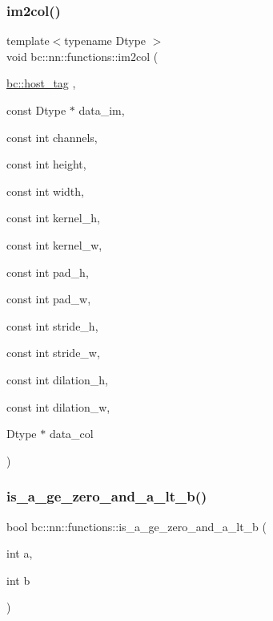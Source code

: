 \subsubsection{\texorpdfstring{im2col()}{im2col()}}
{\footnotesize\ttfamily template$<$typename Dtype $>$ \\
void bc\+::nn\+::functions\+::im2col (\begin{DoxyParamCaption}\item[{\hyperlink{structbc_1_1host__tag}{bc\+::host\+\_\+tag}}]{,  }\item[{const Dtype $\ast$}]{data\+\_\+im,  }\item[{const int}]{channels,  }\item[{const int}]{height,  }\item[{const int}]{width,  }\item[{const int}]{kernel\+\_\+h,  }\item[{const int}]{kernel\+\_\+w,  }\item[{const int}]{pad\+\_\+h,  }\item[{const int}]{pad\+\_\+w,  }\item[{const int}]{stride\+\_\+h,  }\item[{const int}]{stride\+\_\+w,  }\item[{const int}]{dilation\+\_\+h,  }\item[{const int}]{dilation\+\_\+w,  }\item[{Dtype $\ast$}]{data\+\_\+col }\end{DoxyParamCaption})}

\mbox{\label{namespacebc_1_1nn_1_1functions_ab4bba863093d317e1b8d22ce21c1b1a5}} 
\subsubsection{\texorpdfstring{is\+\_\+a\+\_\+ge\+\_\+zero\+\_\+and\+\_\+a\+\_\+lt\+\_\+b()}{is\_a\_ge\_zero\_and\_a\_lt\_b()}}
{\footnotesize\ttfamily bool bc\+::nn\+::functions\+::is\+\_\+a\+\_\+ge\+\_\+zero\+\_\+and\+\_\+a\+\_\+lt\+\_\+b (\begin{DoxyParamCaption}\item[{int}]{a,  }\item[{int}]{b }\end{DoxyParamCaption})\hspace{0.3cm}{\ttfamily [inline]}}

